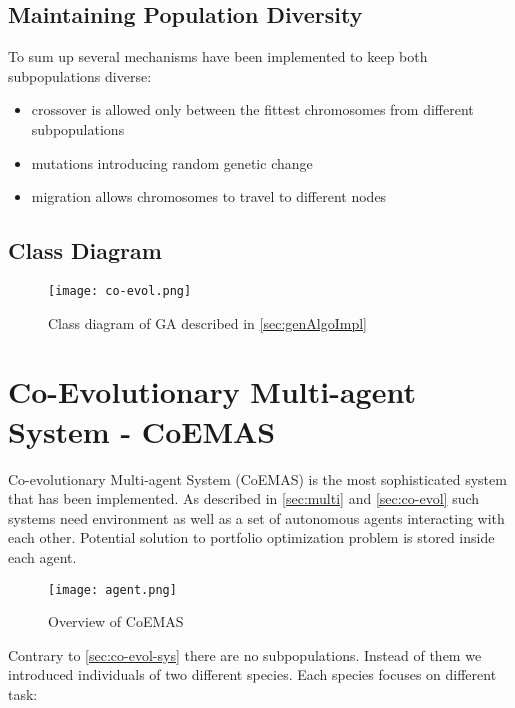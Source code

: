 \subsection{Maintaining Population Diversity}

To sum up several mechanisms have been implemented to keep both subpopulations diverse:

\begin{itemize}
  \item crossover is allowed only between the fittest chromosomes from different subpopulations 
  \item mutations introducing random genetic change
  \item migration allows chromosomes to travel to different nodes  
\end{itemize}

\subsection{Class Diagram}
\label{Co-evol-class-diagram}

\begin{figure}[H]   
	    \begin{center}
	      \texttt{[image: co-evol.png]}
	    \end{center}
	    \caption{Class diagram of GA described in \ref{sec:genAlgoImpl}} 
	  \end{figure}


\section{Co-Evolutionary Multi-agent System - CoEMAS}

Co-evolutionary Multi-agent System (CoEMAS) is the most sophisticated system that has been implemented.
As described in \ref{sec:multi} and \ref{sec:co-evol} such systems need environment as well as a set of autonomous agents interacting with each other.
Potential solution to portfolio optimization problem is stored inside each agent.


\begin{figure}[H]   
	    \begin{center}
	      \texttt{[image: agent.png]}
	    \end{center}
	    \caption{Overview of CoEMAS} 
	  \end{figure}

Contrary to \ref{sec:co-evol-sys} there are no subpopulations.
Instead of them we introduced individuals of two different species.
Each species focuses on different task:

